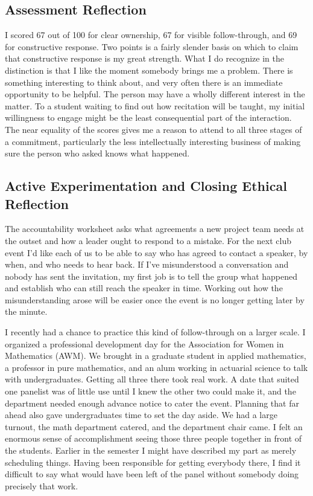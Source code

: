 \documentclass[12pt,letterpaper]{article}
\begin{document}
\subsection{Assessment Reflection}
I scored 67 out of 100 for clear ownership, 67 for visible follow-through, and 69 for constructive response. Two points is a fairly slender basis on which to claim that constructive response is my great strength. What I do recognize in the distinction is that I like the moment somebody brings me a problem. There is something interesting to think about, and very often there is an immediate opportunity to be helpful. The person may have a wholly different interest in the matter. To a student waiting to find out how recitation will be taught, my initial willingness to engage might be the least consequential part of the interaction. The near equality of the scores gives me a reason to attend to all three stages of a commitment, particularly the less intellectually interesting business of making sure the person who asked knows what happened.

\subsection{Active Experimentation and Closing Ethical Reflection}
The accountability worksheet asks what agreements a new project team needs at the outset and how a leader ought to respond to a mistake. For the next club event I'd like each of us to be able to say who has agreed to contact a speaker, by when, and who needs to hear back. If I've misunderstood a conversation and nobody has sent the invitation, my first job is to tell the group what happened and establish who can still reach the speaker in time. Working out how the misunderstanding arose will be easier once the event is no longer getting later by the minute.

I recently had a chance to practice this kind of follow-through on a larger scale. I organized a professional development day for the Association for Women in Mathematics (AWM). We brought in a graduate student in applied mathematics, a professor in pure mathematics, and an alum working in actuarial science to talk with undergraduates. Getting all three there took real work. A date that suited one panelist was of little use until I knew the other two could make it, and the department needed enough advance notice to cater the event. Planning that far ahead also gave undergraduates time to set the day aside. We had a large turnout, the math department catered, and the department chair came. I felt an enormous sense of accomplishment seeing those three people together in front of the students. Earlier in the semester I might have described my part as merely scheduling things. Having been responsible for getting everybody there, I find it difficult to say what would have been left of the panel without somebody doing precisely that work.
\end{document}
